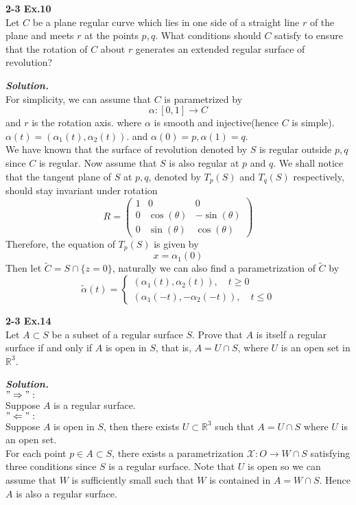 \documentclass{article}
\begin{document}
\par
\textbf{2-3 Ex.10}\\
Let $C$ be a plane regular curve which lies in one side of
a straight line $r$ of the plane and meets $r$ at the points
$p,q$. What conditions should $C$ satisfy to ensure that the
rotation of $C$ about $r$ generates an extended regular
surface of revolution?

\par
\textbf{\textit{Solution.}}\\
For simplicity, we can assume that $C$ is parametrized by
$$
    \alpha: [0,1] \to C
$$
and $r$ is the rotation axis.
where $\alpha$ is smooth and injective(hence $C$ is simple).
$\alpha(t)=(\alpha_1(t), \alpha_2(t))$.
and $\alpha(0)=p, \alpha(1)=q$.\\
We have known that the surface of revolution denoted by $S$
is regular outside $p,q$ since $C$ is regular. Now assume
that $S$ is also regular at $p$ and $q$. We shall notice that
the tangent plane of $S$ at $p,q$, denoted by $T_p(S)$ and
$T_q(S)$ respectively, should stay invariant under rotation
$$
    R = 
    \left(
    \begin{array}{ccc}
        1 & 0 & 0\\
        0 & \cos(\theta) & -\sin(\theta)\\
        0 & \sin(\theta) & \cos(\theta)
    \end{array}
    \right)
$$
Therefore, the equation of $T_p(S)$ is given by
$$
    x = \alpha_1(0)
$$
Then let $\tilde{C}=S\cap \{z=0\}$, naturally we can also
find a parametrization of $\tilde{C}$ by
$$
    \tilde{\alpha}(t)
    =
    \begin{cases}
        (\alpha_1(t), \alpha_2(t)),\quad t \geq 0\\
        (\alpha_1(-t), -\alpha_2(-t)), \quad t \leq 0
    \end{cases}
$$

\par
\textbf{2-3 Ex.14}\\
Let $A \subset S$ be a subset of a regular surface $S$.
Prove that $A$ is itself a regular surface if and only if
$A$ is open in $S$, that is, $A = U \cap S$, where $U$ is
an open set in $\mathbb{R}^3$.

\par
\textbf{\textit{Solution.}}\\
$"\Rightarrow":$\\
Suppose $A$ is a regular surface.\\
$"\Leftarrow":$\\
Suppose $A$ is open in $S$, then there exists 
$U \subset \mathbb{R}^3$ such that $A = U \cap S$
where $U$ is an open set.\\
For each point $p \in A \subset S$, there exists
a parametrization $\mathcal{X}: O \to W \cap S$
satisfying three conditions since $S$ is a regular
surface. Note that $U$ is open so we can assume that
$W$ is sufficiently small such that $W$ is contained
in $A=W\cap S$. Hence $A$ is also a regular surface.
\end{document}
